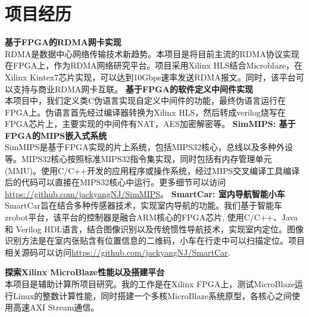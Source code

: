 \documentclass[11pt,a4paper]{moderncv}
\begin{document}
	\section{项目经历}
	{
		\smallskip
		\textbf{基于FPGA的RDMA网卡实现}
		\medskip \\
		RDMA是数据中心网络传输技术新趋势。本项目是将目前主流的RDMA协议实现在FPGA上，作为RDMA网络研究平台。项目采用Xilinx HLS结合Microblaze，在Xilinx Kintex7芯片实现，可以达到10Gbps速率发送RDMA报文。同时，该平台可以支持与商业RDMA网卡互联。\newline
	}
	{
		\smallskip
		\textbf{基于FPGA的软件定义中间件实现}
		\medskip \\
		本项目中，我们定义类C伪语言实现自定义中间件的功能，最终伪语言运行在FPGA上。伪语言首先经过编译器转换为Xilinx HLS，然后转成verilog烧写在FPGA芯片上，主要实现的中间件有NAT，AES加密解密等。
	}
	{
		\smallskip
		\textbf{SimMIPS: 基于FPGA的MIPS嵌入式系统}
		\medskip \\
		SimMIPS是基于FPGA实现的片上系统，包括MIPS32核心，总线以及多种外设等。MIPS32核心按照标准MIPS32指令集实现，同时包括有内存管理单元(MMU)。使用C/C++开发的应用程序或操作系统，经过MIPS交叉编译工具编译后的代码可以直接在MIPS32核心中运行。更多细节可以访问\url{https://github.com/jackyangNJ/SimMIPS}。 \newline
	}
	{
		\smallskip
		\textbf{SmartCar: 室内导航智能小车}
		\medskip  \\
		SmartCar旨在结合多种传感器技术，实现室内导航的功能。我们基于智能车zrobot平台，该平台的控制器是融合ARM核心的FPGA芯片, 使用C/C++、Java 和 Verilog HDL语言，结合图像识别以及传统惯性导航技术，实现室内定位。图像识别方法是在室内张贴含有位置信息的二维码，小车在行走中可以扫描定位。项目相关源码可以访问\url{https://github.com/jackyangNJ/SmartCar}.\newline
	}
	
	{
		\smallskip
		\textbf{探索Xilinx MicroBlaze性能以及搭建平台}
		\medskip  \\
		本项目是辅助计算所项目研究。我的工作是在Xilinx FPGA上，测试MicroBlaze运行Linux的整数计算性能，同时搭建一个多核MicroBlaze系统原型，各核心之间使用高速AXI Stream通信。
	}
	
	
	
\end{document}
